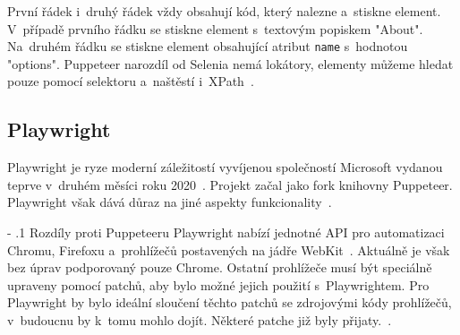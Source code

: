 \documentclass[12pt, a4paper, twoside]{article}
\makeatletter
\renewcommand\paragraph{%
	\@startsection{subparagraph}{5}{0mm}%
	{-\baselineskip}%
	{.1\baselineskip}%
	{\normalfont\normalsize\bfseries}}
\makeatother
\begin{document}
První řádek i~druhý řádek vždy obsahují kód, který nalezne a~stiskne element. V~případě prvního řádku se stiskne element s~textovým popiskem "About". Na~druhém řádku se stiskne element obsahující atribut \texttt{name} s~hodnotou "options". Puppeteer narozdíl od Selenia nemá lokátory, elementy můžeme hledat pouze pomocí selektoru a~naštěstí i~XPath\label{text:puppeteerLocatorSupport}~\cite{puppeteerApi}.

	\newpage
	\subsection{Playwright}
	\label{sub_sec:Playwright}
	Playwright je ryze moderní záležitostí vyvíjenou společností Microsoft vydanou teprve v~druhém měsíci roku 2020~\cite{playwrightFirstRelease}. Projekt začal jako fork knihovny Puppeteer. Playwright však dává důraz na jiné aspekty funkcionality~\cite{playwrightGithub}.
	
	\paragraph{Rozdíly proti Puppeteeru}
	Playwright nabízí jednotné API pro automatizaci Chromu, Firefoxu a~prohlížečů postavených na jádře WebKit~\cite{playwrightMainPage}. Aktuálně je však bez úprav podporovaný pouze Chrome. Ostatní prohlížeče musí být speciálně upraveny pomocí patchů, aby bylo možné jejich použití s~Playwrightem. Pro Playwright by bylo ideální sloučení těchto patchů se zdrojovými kódy prohlížečů, v~budoucnu by k~tomu mohlo dojít. Některé patche již byly přijaty.~\cite{playwrightBrowserPatches}.
	
\end{document}

